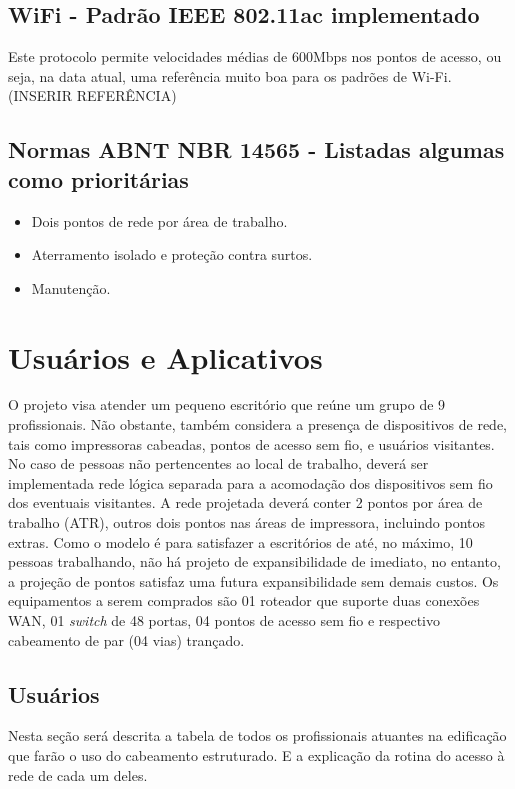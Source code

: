 \documentclass[	DIV=calc,%
							paper=a4,%
							fontsize=12pt,%
							onecolumn]{scrartcl}	 					%
\begin{document}
\subsection{WiFi - Padrão IEEE 802.11ac implementado}
Este protocolo permite velocidades médias de 600Mbps nos pontos de acesso, ou seja, na data atual, uma referência muito boa para os padrões de Wi-Fi. (INSERIR REFERÊNCIA) 

\subsection{Normas ABNT NBR 14565 - Listadas algumas como prioritárias}
\begin{itemize}
	\item Dois pontos de rede por área de trabalho. \cite{abnt14565}
	\item Aterramento isolado e proteção contra surtos. \cite{abnt14565}
	\item Manutenção. \cite{abnt14565}
	
\end{itemize}


\section{Usuários e Aplicativos}
O projeto visa atender um pequeno escritório que reúne um grupo de 9 profissionais. Não obstante, também considera a presença de dispositivos de rede, tais como impressoras cabeadas, pontos de acesso sem fio, e usuários visitantes. No caso de pessoas não pertencentes ao local de trabalho, deverá ser implementada rede lógica separada para a acomodação dos dispositivos sem fio dos eventuais visitantes. A rede projetada deverá conter 2 pontos por área de trabalho (ATR), outros dois pontos nas áreas de impressora, incluindo pontos extras. Como o modelo é para satisfazer a escritórios de até, no máximo, 10 pessoas trabalhando, não há projeto de expansibilidade de imediato, no entanto, a projeção de pontos satisfaz uma futura expansibilidade sem demais custos. Os equipamentos a serem comprados são 01 roteador que suporte duas conexões WAN, 01 \textit{switch} de 48 portas, 04 pontos de acesso sem fio e respectivo cabeamento de par (04 vias) trançado.

\subsection{Usuários}

Nesta seção será descrita a tabela de todos os profissionais atuantes na edificação que farão o uso do cabeamento estruturado. E a explicação da rotina do acesso à rede de cada um deles.
\end{document}

